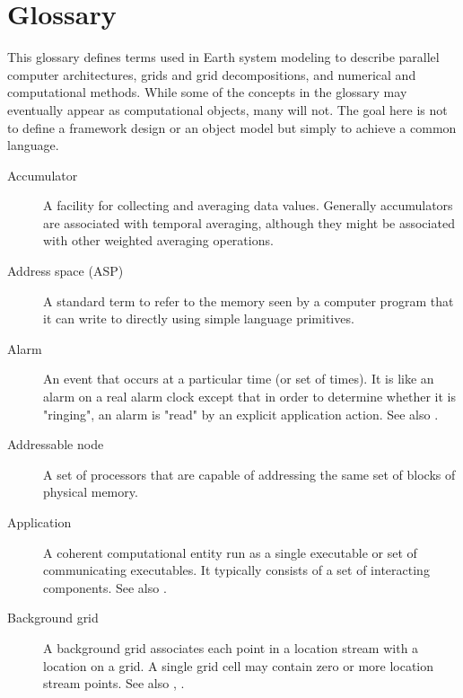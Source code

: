\section{Glossary}
\label{sec:glos}

This glossary defines terms used in Earth system modeling to describe 
parallel computer architectures, grids and grid decompositions, and 
numerical and computational methods.  While some of the concepts in 
the glossary may eventually appear as computational objects, many 
will not.  The goal here is not to define a framework design or an 
object model but simply to achieve a common language.

\begin{description}

\item[Accumulator] \label{glos:Accumulator} A facility for collecting and 
  averaging data values.  Generally accumulators are associated with 
  temporal averaging, although they might be associated with 
  other weighted averaging operations.    
  
\item[Address space (ASP)] \label{glos:ASP}A standard term to refer to the memory
  seen by a computer program that it can write to directly using
  simple language primitives. 

\item[Alarm] \label{glos:Alarm} An event that occurs at a particular 
  time (or set of times).  It is like an alarm on a real alarm clock 
  except that in order to determine whether it is "ringing", an alarm 
  is "read" by an explicit application action.
  See also .

\item[Addressable node] \label{glos:Anode} A set of processors that are
  capable of addressing the same set of blocks of physical memory.

\item[Application] \label{glos:Application} A coherent computational 
  entity run as a single executable or set of communicating executables.  
  It typically consists of a set of interacting components.  
  See also .

\item[Background grid] \label{glos:BackGrid} 
  A background grid associates each point in a location stream with a 
  location on a grid. A single grid cell may contain zero or more location 
  stream points. See also , . 


\end{description}
